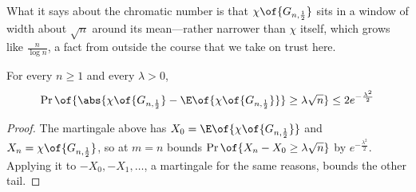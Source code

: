 What it says about the chromatic number is that $\chi\of{G_{n, \frac{1}{2}}}$ sits in a window of width about $\sqrt{n}$ around its mean---rather narrower than $\chi$ itself, which grows like $\frac{n}{\log n}$, a fact from outside the course that we take on trust here.

\begin{boxcorollary} \label{Ch3:Cor:Chromatic_Concentration}
    For every $n \geq 1$ and every $\lambda > 0$,
    \begin{align*}
        \Pr\of{\abs{\chi\of{G_{n, \frac{1}{2}}} - \E\of{\chi\of{G_{n, \frac{1}{2}}}}} \geq \lambda \sqrt{n}} \leq 2 e^{-\frac{\lambda^2}{2}}
    \end{align*}
\end{boxcorollary}
\begin{proof}
    The martingale above has $X_0 = \E\of{\chi\of{G_{n, \frac{1}{2}}}}$ and $X_n = \chi\of{G_{n, \frac{1}{2}}}$, so  at $m = n$ bounds $\Pr\of{X_n - X_0 \geq \lambda \sqrt{n}}$ by $e^{-\frac{\lambda^2}{2}}$. Applying it to $-X_0, -X_1, \ldots$, a martingale for the same reasons, bounds the other tail.
\end{proof}